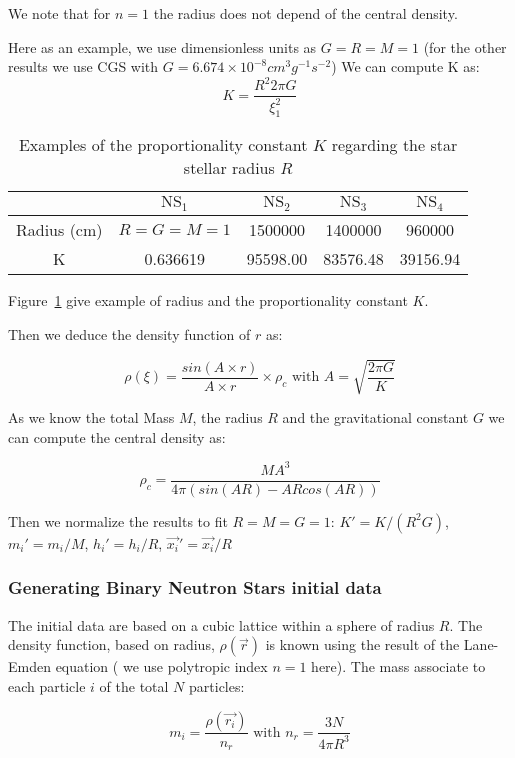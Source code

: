We note that for $n=1$ the radius does not depend of the central density.

Here as an example, we use dimensionless units as $G=R=M=1$ (for the other results we use CGS with $G = 6.674 \times 10^{-8} cm^3g^{-1}s^{-2}$) 
We can compute K as: 
\begin{equation}
\label{eq:constant}
K = \frac{R^2  2 \pi G}{\xi_1^2}
\end{equation}
%
\begin{table}[t!]
\centering
\begin{tabular}{|c|c|c|c|c|}
\hline
 & $\mbox{NS}_1$ & $\mbox{NS}_2$ & $\mbox{NS}_3$ & $\mbox{NS}_4$ \\ 
\hline 
Radius (cm) & $R=G=M=1$ & 1500000 & 1400000 & 960000 \\ 
\hline 
K & 0.636619 & 95598.00 & 83576.48 & 39156.94\\ 
\hline 
\end{tabular}
\caption{Examples of the proportionality constant $K$ regarding the star stellar radius $R$}
\label{tab:example_radius_k}
\end{table} 
Figure~\ref{tab:example_radius_k} give example of radius and the proportionality constant $K$.


Then we deduce the density function of $r$ as:

$$\rho(\xi) = \frac{sin(A\times r)}{A \times r} \times \rho_c \mbox{ with } A = \sqrt{\frac{2\pi G}{K}}
$$

As we know the total Mass $M$, the radius $R$ and the gravitational constant $G$ we can compute the central density as: 

$$ \rho_c = \frac{M A^3}{4 \pi (sin(AR)-ARcos(AR)) } $$

Then we normalize the results to fit $R = M = G = 1$: $K' = K/(R^2G) $, $m_i' = m_i/M $, $h_i' = h_i / R$, $\vec{x_i}' = \vec{x_i}/R$ 

\subsubsection{Generating Binary Neutron Stars initial data}
\label{sec:equi}

The initial data are based on a cubic lattice within a sphere of radius $R$.
The density function, based on radius, $\rho(\vec{r})$ is known using the result of the Lane-Emden equation ( we use polytropic index $n = 1$ here). 
The mass associate to each particle $i$ of the total $N$ particles: 

$$ m_i = \frac{\rho(\vec{r_i})}{n_r} \mbox{ with } n_r = \frac{3N}{4 \pi R^3}$$ 

